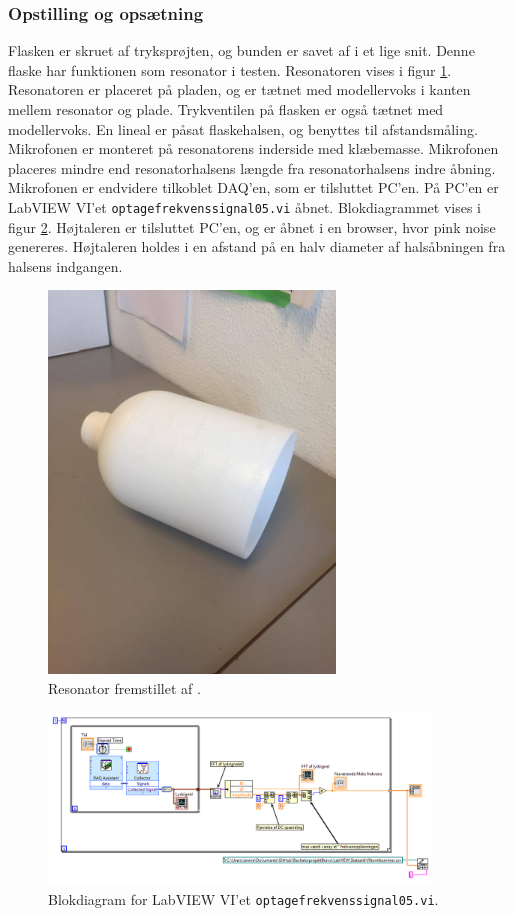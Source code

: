 	\subsubsection{Opstilling og opsætning}
	Flasken er skruet af tryksprøjten, og bunden er savet af i et lige snit. Denne flaske har funktionen som resonator i testen. Resonatoren vises i figur \ref{fig:resonator}. Resonatoren er placeret på pladen, og er tætnet med modellervoks i kanten mellem resonator og plade. Trykventilen på flasken er også tætnet med modellervoks. En lineal er påsat flaskehalsen, og benyttes til afstandsmåling. Mikrofonen er monteret på resonatorens inderside med klæbemasse. Mikrofonen placeres mindre end resonatorhalsens længde fra  resonatorhalsens indre åbning. Mikrofonen er endvidere tilkoblet DAQ'en, som er tilsluttet PC'en. På PC'en er LabVIEW VI'et \texttt{optagefrekvenssignal05.vi} åbnet. Blokdiagrammet vises i figur \ref{fig:optagefrekvenssignal05}. Højtaleren er tilsluttet PC'en, og \onlineg er åbnet i en browser, hvor pink noise genereres. Højtaleren holdes i en afstand på en halv diameter af halsåbningen fra halsens indgangen.  
	
	\begin{figure}[htb]
	\centering
	\includegraphics[width=3in]{resonator.jpg}
	\caption{Resonator fremstillet af .}
	\label{fig:resonator}	
	\end{figure}

	\begin{figure}[htb]
	\centering
	\includegraphics[width=4in]{optagefrekvenssignal05.png}
	\caption{Blokdiagram for LabVIEW VI'et \texttt{optagefrekvenssignal05.vi}.}
	\label{fig:optagefrekvenssignal05}	
	\end{figure}
	
